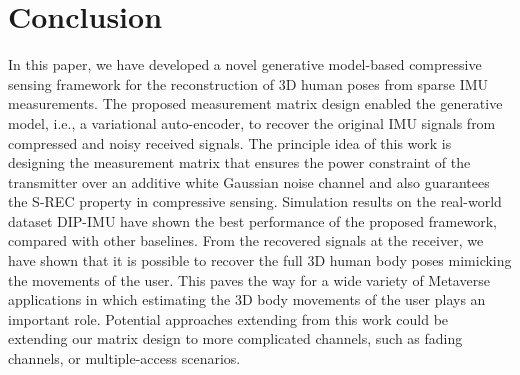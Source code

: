 \documentclass[conference, 10pt]{IEEEtran}
\begin{document}
\vspace{-0.1cm}
\section{Conclusion}
In this paper, we have developed a novel generative model-based compressive sensing framework for the reconstruction of 3D human poses from sparse IMU measurements. The proposed measurement matrix design enabled the generative model, i.e., a variational auto-encoder, to recover the original IMU signals from compressed and noisy received signals. The principle idea of this work is designing the measurement matrix that ensures the power constraint of the transmitter over an additive white Gaussian noise channel and also guarantees the S-REC property in compressive sensing. Simulation results on the real-world dataset DIP-IMU have shown the best performance of the proposed framework, compared with other baselines. From the recovered signals at the receiver, we have shown that it is possible to recover the full 3D human body poses mimicking the movements of the user. This paves the way for a wide variety of Metaverse applications in which estimating the 3D body movements of the user plays an important role. Potential approaches extending from this work could be extending our matrix design to more complicated channels, such as fading channels, or multiple-access scenarios.

\vspace{-0.1cm}


\end{document}
